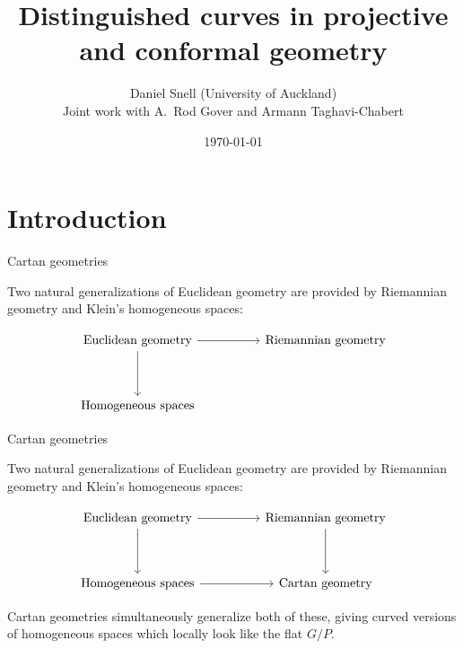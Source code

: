 \documentclass{beamer}
\title[Distinguished curves]{Distinguished curves in projective and conformal geometry}
\author[Daniel Snell (UoA)]{Daniel Snell (University of Auckland)\\{ \bigskip\bigskip \small Joint work with
A.\ Rod Gover and Armann Taghavi-Chabert}}
\date{\today}
\begin{document}
\begin{frame}
  \titlepage
\end{frame}

\section{Introduction}

\begin{frame}{Cartan geometries}

Two natural generalizations of Euclidean geometry are provided by Riemannian geometry and Klein's homogeneous spaces:

\vspace{1em}
\[
\begin{tikzcd}[ampersand replacement=\&, row sep=huge, column sep=huge]
\textnormal{Euclidean geometry} \arrow[r] \arrow[d] \& \textnormal{Riemannian geometry} \\
\textnormal{Homogeneous spaces} \&
\end{tikzcd}
\]

\vspace{1em}
\phantom{Cartan geometries simultaneously generalize both of these, giving curved versions of homogeneous spaces which locally look like the flat \( G/P \).}

\end{frame}

\begin{frame}{Cartan geometries}

Two natural generalizations of Euclidean geometry are provided by Riemannian geometry and Klein's homogeneous spaces:

\vspace{1em}
\[
\begin{tikzcd}[ampersand replacement=\&, row sep=huge, column sep=huge]
\textnormal{Euclidean geometry} \arrow[r] \arrow[d] \& \textnormal{Riemannian geometry} \arrow[d]\\
\textnormal{Homogeneous spaces} \arrow[r] \& \textnormal{Cartan geometry}
\end{tikzcd}
\]

\vspace{1em}
Cartan geometries simultaneously generalize both of these, giving curved versions of homogeneous spaces which locally look like the flat \( G/P \).

\end{frame}
\end{document}
